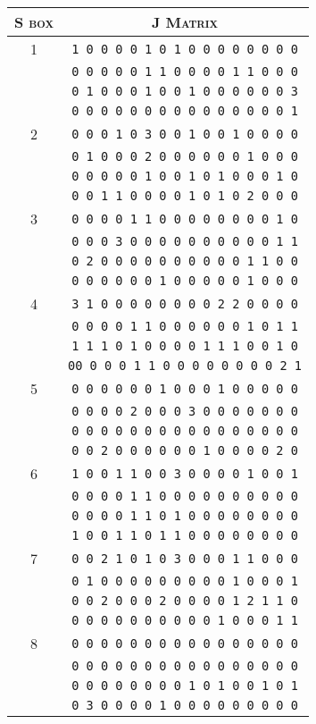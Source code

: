 \documentclass[a4paper,10pt]{article}
\begin{document}
\begin{center}\begin{longtable}{c|c}
\hline
\textsc{S box} & \textsc{J Matrix}\\
\hline
1&\texttt{1 0 0 0 0 1 0 1 0 0 0 0 0 0 0 0}\\ 
&\texttt{0 0 0 0 0 1 1 0 0 0 0 1 1 0 0 0}\\
&\texttt{0 1 0 0 0 1 0 0 1 0 0 0 0 0 0 3}\\
&\texttt{0 0 0 0 0 0 0 0 0 0 0 0 0 0 0 1}\\
\hline
2&\texttt{0 0 0 1 0 3 0 0 1 0 0 1 0 0 0 0}\\ 
&\texttt{0 1 0 0 0 2 0 0 0 0 0 0 1 0 0 0}\\
&\texttt{0 0 0 0 0 1 0 0 1 0 1 0 0 0 1 0}\\
&\texttt{0 0 1 1 0 0 0 0 1 0 1 0 2 0 0 0}\\
\hline
3&\texttt{0 0 0 0 1 1 0 0 0 0 0 0 0 0 1 0}\\ 
&\texttt{0 0 0 3 0 0 0 0 0 0 0 0 0 0 1 1}\\
&\texttt{0 2 0 0 0 0 0 0 0 0 0 0 1 1 0 0}\\
&\texttt{0 0 0 0 0 0 1 0 0 0 0 0 1 0 0 0}\\
\hline
4&\texttt{3 1 0 0 0 0 0 0 0 0 2 2 0 0 0 0}\\ 
&\texttt{0 0 0 0 1 1 0 0 0 0 0 0 1 0 1 1}\\
&\texttt{1 1 1 0 1 0 0 0 0 1 1 1 0 0 1 0}\\
&\texttt{00 0 0 0 1 1 0 0 0 0 0 0 0 0 2 1}\\
\hline
5&\texttt{0 0 0 0 0 0 1 0 0 0 1 0 0 0 0 0}\\ 
&\texttt{0 0 0 0 2 0 0 0 3 0 0 0 0 0 0 0}\\
&\texttt{0 0 0 0 0 0 0 0 0 0 0 0 0 0 0 0}\\
&\texttt{0 0 2 0 0 0 0 0 0 1 0 0 0 0 2 0}\\
\hline
6&\texttt{1 0 0 1 1 0 0 3 0 0 0 0 1 0 0 1}\\ 
&\texttt{0 0 0 0 1 1 0 0 0 0 0 0 0 0 0 0}\\
&\texttt{0 0 0 0 1 1 0 1 0 0 0 0 0 0 0 0}\\
&\texttt{1 0 0 1 1 0 1 1 0 0 0 0 0 0 0 0}\\
\hline
7&\texttt{0 0 2 1 0 1 0 3 0 0 0 1 1 0 0 0}\\ 
&\texttt{0 1 0 0 0 0 0 0 0 0 0 1 0 0 0 1}\\
&\texttt{0 0 2 0 0 0 2 0 0 0 0 1 2 1 1 0}\\
&\texttt{0 0 0 0 0 0 0 0 0 0 1 0 0 0 1 1}\\
\hline
8&\texttt{0 0 0 0 0 0 0 0 0 0 0 0 0 0 0 0}\\ 
&\texttt{0 0 0 0 0 0 0 0 0 0 0 0 0 0 0 0}\\
&\texttt{0 0 0 0 0 0 0 0 1 0 1 0 0 1 0 1}\\
&\texttt{0 3 0 0 0 0 1 0 0 0 0 0 0 0 0 0}\\
\hline
\end{longtable}\end{center}
\end{document}
